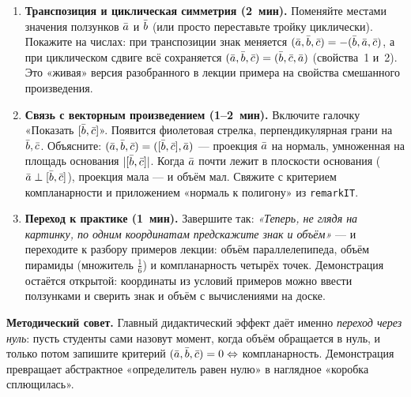 \begin{enumerate}
  \item \textbf{Транспозиция и циклическая симметрия (2~мин).}
    Поменяйте местами значения ползунков $\bar{a}$ и $\bar{b}$ (или просто переставьте
    тройку циклически). Покажите на числах: при транспозиции знак меняется
    $(\bar{a},\bar{b},\bar{c})=-(\bar{b},\bar{a},\bar{c})$, а при циклическом сдвиге всё сохраняется
    $(\bar{a},\bar{b},\bar{c})=(\bar{b},\bar{c},\bar{a})$ (свойства~1 и~2). Это «живая» версия
    разобранного в лекции примера на свойства смешанного произведения.

  \item \textbf{Связь с векторным произведением (1--2~мин).}
    Включите галочку «Показать $[\bar{b},\bar{c}]$». Появится фиолетовая стрелка,
    перпендикулярная грани на $\bar{b},\bar{c}$. Объясните: $(\bar{a},\bar{b},\bar{c})=
    ([\bar{b},\bar{c}],\bar{a})$ — проекция $\bar{a}$ на нормаль, умноженная на площадь
    основания $|[\bar{b},\bar{c}]|$. Когда $\bar{a}$ почти лежит в плоскости основания
    ($\bar{a}\perp[\bar{b},\bar{c}]$), проекция мала — и объём мал. Свяжите с критерием
    компланарности и приложением «нормаль к полигону» из \texttt{remarkIT}.

  \item \textbf{Переход к практике (1~мин).}
    Завершите так: \emph{«Теперь, не глядя на картинку, по одним координатам
    предскажите знак и объём»} — и переходите к разбору примеров лекции:
    объём параллелепипеда, объём пирамиды (множитель
    $\tfrac16$) и компланарность четырёх точек. Демонстрация
    остаётся открытой: координаты из условий примеров можно ввести ползунками
    и сверить знак и объём с вычислениями на доске.
\end{enumerate}

\noindent\textbf{Методический совет.} Главный дидактический эффект даёт
именно \emph{переход через нуль}: пусть студенты сами назовут момент, когда
объём обращается в нуль, и только потом запишите критерий
$(\bar{a},\bar{b},\bar{c})=0\Leftrightarrow$ компланарность. Демонстрация превращает
абстрактное «определитель равен нулю» в наглядное «коробка сплющилась».
